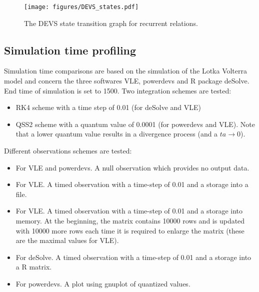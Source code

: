 \documentclass{article}
\theoremstyle{remark}
\begin{document}
\begin{landscape}
\vspace{-10cm}
\begin{figure}[!h]
\begin{center} 
\texttt{[image: figures/DEVS\_states.pdf]}
\caption{\label{fig:DEVSgraph} The DEVS state transition graph 
for recurrent relations.}
\end{center}
\end{figure}
\end{landscape}

\subsection{Simulation time profiling}

Simulation time comparisons are based on the simulation of the Lotka Volterra
model and concern the three softwares VLE, powerdevs and R package deSolve. 
End time of simulation is set to 1500.
Two integration schemes are tested:
\begin{itemize}
  \item RK4 scheme with a time step of 0.01 (for deSolve and VLE)
  \item QSS2 scheme with a quantum value of 0.0001 (for powerdevs and VLE). Note
  that a lower quantum value results in a divergence process (and a $ta \to
  0$).
\end{itemize}
Different observations schemes are tested:
\begin{itemize}
  \item For VLE and powerdevs. A null observation which provides no output
  data.
  \item For VLE. A timed observation with a time-step of 0.01 and a 
  storage into a file.
  \item For VLE. A timed observation with a time-step of 0.01 and a 
  storage into memory. At the beginning, the matrix contains 
  10000 rows and is updated with 10000 more rows each time it is required to
  enlarge the matrix (these are the maximal values for VLE).
  \item For deSolve. A timed observation with a time-step of 0.01 and a 
  storage into a R matrix.
  \item For powerdevs. A plot using gnuplot of quantized values.
\end{itemize}
\end{document}
